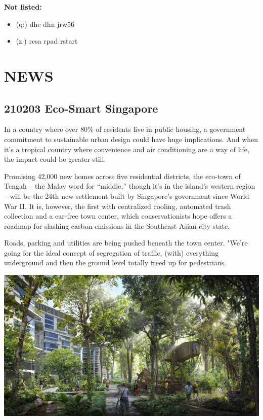 \documentclass[
]{book}
\providecommand{\tightlist}{%
  \setlength{\itemsep}{0pt}\setlength{\parskip}{0pt}}
\begin{document}
\textbf{Not listed:}

\begin{itemize}
\tightlist
\item
  (q:) dhe dhn jrw56
\item
  (z:) rcsa rpad rstart
\end{itemize}

\hypertarget{news}{%
\chapter{NEWS}\label{news}}

\hypertarget{eco-smart-singapore}{%
\section{210203 Eco-Smart Singapore}\label{eco-smart-singapore}}

In a country where over 80\% of residents live in public housing, a government commitment to sustainable urban design could have huge implications. And when it's a tropical country where convenience and air conditioning are a way of life, the impact could be greater still.

Promising 42,000 new homes across five residential districts, the eco-town of Tengah -- the Malay word for ``middle,'' though it's in the island's western region -- will be the 24th new settlement built by Singapore's government since World War II. It is, however, the first with centralized cooling, automated trash collection and a car-free town center, which conservationists hope offers a roadmap for slashing carbon emissions in the Southeast Asian city-state.

Roads, parking and utilities are being pushed beneath the town center. "We're going for the ideal concept of segregation of traffic, (with) everything underground and then the ground level totally freed up for pedestrians.

\includegraphics{fig/Singapore_Tengah_Forest_Town.jpg}
\end{document}
